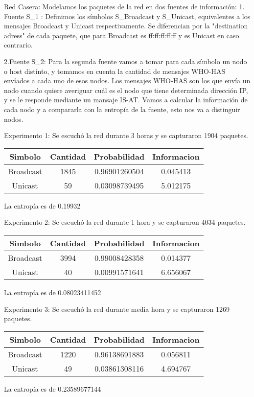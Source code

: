 Red Casera:
Modelamos los paquetes de la red en dos fuentes de información:
1. Fuente S\_1 : Definimos los símbolos S\_Broadcast y S\_Unicast, equivalentes a los mensajes Broadcast y Unicast respectivamente. Se diferencian por la "destination adress" de cada paquete, que para Broadcast es ff:ff:ff:ff:ff y es Unicast en caso contrario.



2.Fuente S\_2: Para la segunda fuente vamos a tomar para cada símbolo un nodo o host distinto, y tomamos en cuenta la cantidad de mensajes WHO-HAS envíados a cada uno de esos nodos.
	Los mensajes WHO-HAS son los que envía un nodo cuando quiere averiguar cuál es el nodo que tiene determinada dirección IP, y se le responde mediante un mansaje IS-AT.
Vamos a calcular la información de cada nodo y a compararla con la entropía de la fuente, esto nos va a distinguir nodos.


Experimento 1:
Se escuchó la red durante 3 horas y se capturaron 1904 paquetes.
\begin{center}
 \begin{tabular}{||c c c c||}
 \hline
 Simbolo & Cantidad & Probabilidad & Informacion \\ [0.5ex]
 \hline\hline
 Broadcast & 1845 & 0.96901260504 & 0.045413 \\
 \hline
 Unicast & 59 & 0.03098739495 & 5.012175 \\[1ex]
 \hline
\end{tabular}
\end{center}
La entropía es de 0.19932

Experimento 2:
Se escuchó la red durante 1 hora y se capturaron 4034 paquetes.
\begin{center}
 \begin{tabular}{||c c c c||}
 \hline
 Simbolo & Cantidad & Probabilidad & Informacion \\ [0.5ex]
 \hline\hline
 Broadcast & 3994 & 0.99008428358 & 0.014377 \\
 \hline
 Unicast & 40 & 0.00991571641 & 6.656067 \\[1ex]
 \hline
\end{tabular}
\end{center}
La entropía es de 0.08023411452

Experimento 3:
Se escuchó la red durante media hora y se capturaron 1269 paquetes.
\begin{center}
 \begin{tabular}{||c c c c||}
 \hline
 Simbolo & Cantidad & Probabilidad & Informacion \\ [0.5ex]
 \hline\hline
 Broadcast & 1220 & 0.96138691883 & 0.056811 \\
 \hline
 Unicast & 49 & 0.03861308116 & 4.694767 \\[1ex]
 \hline
\end{tabular}
\end{center}
La entropía es de 0.23589677144
